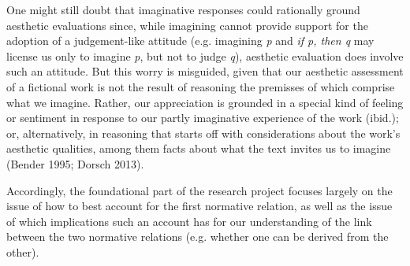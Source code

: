 One might still doubt that imaginative responses could rationally ground aesthetic evaluations since, while imagining cannot provide support for the adoption of a judgement-like attitude (e.g. imagining \emph{p} and \emph{if p, then q} may license us only to imagine \emph{p}, but not to judge \emph{q}), aesthetic evaluation does involve such an attitude. But this worry is misguided, given that our aesthetic assessment of a fictional work is not the result of reasoning the premisses of which comprise what we imagine. Rather, our appreciation is grounded in a special kind of feeling or sentiment in response to our partly imaginative experience of the work (ibid.); or, alternatively, in reasoning that starts off with considerations about the work's aesthetic qualities, among them facts about what the text invites us to imagine (Bender 1995; Dorsch 2013).

Accordingly, the foundational part of the research project focuses largely on the issue of how to best account for the first normative relation, as well as the issue of which implications such an account has for our understanding of the link between the two normative relations (e.g. whether one can be derived from the other).

